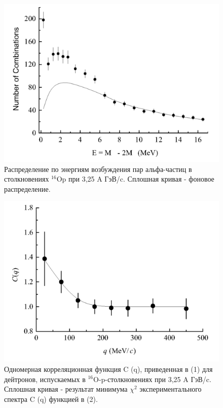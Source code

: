 \documentclass[fontsize=14pt]{scrarticle}
\begin{document}
\begin{figure}[!ht]
\centerline{\includegraphics[scale=.5]{picture7.png}}
\caption{Распределение по энергиям возбуждения пар альфа-частиц в столкновениях $^{16}$Op при 3,25 A ГэВ/c. Сплошная кривая - фоновое распределение.}
\label{fig11}
\end{figure}

\begin{figure}[!ht]
\centerline{\includegraphics[scale=.5]{picture9.png}}
\caption{Одномерная корреляционная функция C (q), приведенная в (1) для дейтронов, испускаемых в $^{16}$O-p-столкновениях при 3,25 A ГэВ/c. Сплошная кривая - результат минимума $\chi^{2}$ экспериментального спектра C (q) функцией в (2).}
\label{fig13}
\end{figure}
  
\end{document}
